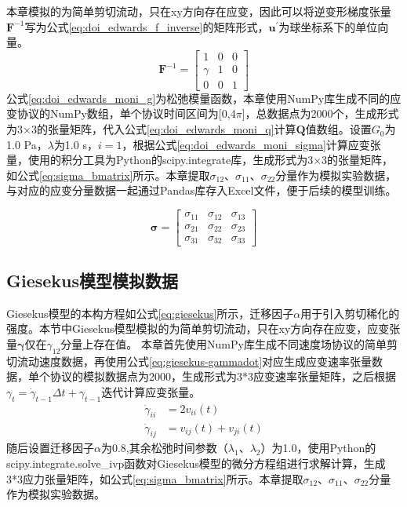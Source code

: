 本章模拟的为简单剪切流动，只在xy方向存在应变，因此可以将逆变形梯度张量$\mathbf{F}^{-1}$写为公式\eqref{eq:doi_edwards_f_inverse}的矩阵形式，$\mathbf{u}^{\prime}$为球坐标系下的单位向量。
\begin{equation}
  \mathbf{F}^{-1} = \begin{bmatrix}
    1      & 0 & 0 \\
    \gamma & 1 & 0 \\
    0      & 0 & 1
  \end{bmatrix} \label{eq:doi_edwards_f_inverse}
\end{equation}
公式\eqref{eq:doi_edwards_moni_g}为松弛模量函数，本章使用NumPy库生成不同的应变协议的NumPy数组，单个协议时间区间为[0,4$\pi$]，总数据点为2000个，生成形式为3$\times$3的张量矩阵，代入公式\eqref{eq:doi_edwards_moni_q}计算$\mathbf{Q}$值数组。设置$G_0$为1.0 Pa，$\lambda$为1.0 s，$i=1$，根据公式\eqref{eq:doi_edwards_moni_sigma}计算应变张量，使用的积分工具为Python的scipy.integrate库，生成形式为3$\times$3的张量矩阵，如公式\eqref{eq:sigma_bmatrix}所示。本章提取$
  \sigma_{12}$、$\sigma_{11}$、$\sigma_{22}$分量作为模拟实验数据，与对应的应变分量数据一起通过Pandas库存入Excel文件，便于后续的模型训练。


\begin{equation}
  \boldsymbol{\sigma} = \begin{bmatrix}
    \sigma_{11} & \sigma_{12} & \sigma_{13} \\
    \sigma_{21} & \sigma_{22} & \sigma_{23} \\
    \sigma_{31} & \sigma_{32} & \sigma_{33}
  \end{bmatrix} \label{eq:sigma_bmatrix}
\end{equation}

\subsection{Giesekus模型模拟数据}
Giesekus模型的本构方程如公式\eqref{eq:giesekus}所示，迁移因子$\alpha$用于引入剪切稀化的强度。本节中Giesekus模型模拟的为简单剪切流动，只在xy方向存在应变，应变张量$\boldsymbol{\gamma}$仅在$\gamma_{12}$分量上存在值。
本章首先使用NumPy库生成不同速度场协议的简单剪切流动速度数据，再使用公式\eqref{eq:giesekus-gammadot}对应生成应变速率张量数据，单个协议的模拟数据点为2000，生成形式为3*3应变速率张量矩阵，之后根据$\gamma_{t}=\dot{\gamma}_{t-1}\Delta t+\gamma_{t-1}$迭代计算应变张量。
\begin{equation}
  \begin{aligned}
    \dot{\gamma}_{ii} & = 2 v_{ii}(t)           \\
    \dot{\gamma}_{ij} & = v_{ij}(t) + v_{ji}(t)
  \end{aligned} \label{eq:giesekus-gammadot}
\end{equation}
随后设置迁移因子$\alpha$为0.8,其余松弛时间参数（$\lambda_1$、$\lambda_2$）为1.0，使用Python的scipy.integrate.solve\_ivp函数对Giesekus模型的微分方程组进行求解计算，生成3*3应力张量矩阵，如公式\eqref{eq:sigma_bmatrix}所示。本章提取$\sigma_{12}$、$\sigma_{11}$、$\sigma_{22}$分量作为模拟实验数据。

